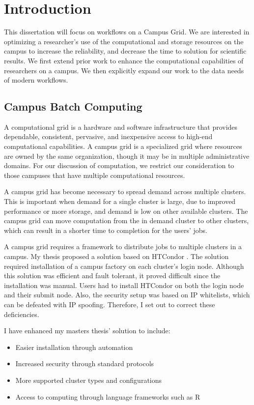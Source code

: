 \chapter{Introduction}

This dissertation will focus on workflows on a Campus Grid.  We are interested in optimizing a researcher's use of the computational and storage resources on the campus to increase the reliability, and decrease the time to solution for scientific results.  We first extend prior work to enhance the computational capabilities of researchers on a campus.  We then explicitly expand our work to the data needs of modern workflows.

\section{Campus Batch Computing}

A computational grid is a hardware and software infrastructure that provides dependable, consistent, pervasive, and inexpensive access to high-end computational capabilities\cite{foster2004grid}.  A campus grid is a specialized grid where resources are owned by the same organization, though it may be in multiple administrative domains.  For our discussion of computation, we restrict our consideration to those campuses that have multiple computational resources.

A campus grid has become necessary to spread demand across multiple clusters.  This is important when demand for a single cluster is large, due to improved performance or more storage, and demand is low on other available clusters.  The campus grid can move computation from the in demand cluster to other clusters, which can result in a shorter time to completion for the users' jobs.

A campus grid requires a framework to distribute jobs to multiple clusters in a campus.  My thesis \cite{weitzel2011campus} proposed a solution based on HTCondor \cite{litzkow1988condor}.  The solution required installation of a campus factory \cite{website:campusfactory} on each cluster's login node.  Although this solution was efficient and fault tolerant, it proved difficult since the installation was manual.  Users had to install HTCondor on both the login node and their submit node.  Also, the security setup was based on IP whitelists, which can be defeated with IP spoofing.  Therefore, I set out to correct these deficiencies.

I have enhanced my masters thesis' solution to include:
\begin{itemize}
\item Easier installation through automation
\item Increased security through standard protocols
\item More supported cluster types and configurations
\item Access to computing through language frameworks such as R \cite{team2005r}
\end{itemize}

